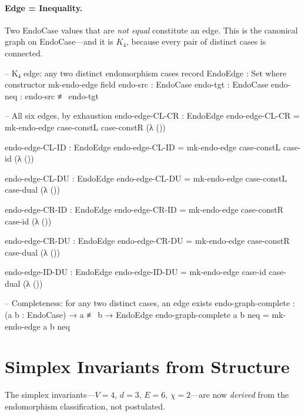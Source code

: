 \documentclass[11pt,a4paper]{book}
\begin{document}
\paragraph{Edge = Inequality.}
Two EndoCase values that are \emph{not equal} constitute an edge. This is the
canonical graph on EndoCase—and it is $K_4$, because every pair of distinct
cases is connected.

\begin{code}
-- K₄ edge: any two distinct endomorphism cases
record EndoEdge : Set where
  constructor mk-endo-edge
  field
    endo-src  : EndoCase
    endo-tgt  : EndoCase
    endo-neq  : endo-src ≢ endo-tgt

-- All six edges, by exhaustion
endo-edge-CL-CR : EndoEdge
endo-edge-CL-CR = mk-endo-edge case-constL case-constR (λ ())

endo-edge-CL-ID : EndoEdge
endo-edge-CL-ID = mk-endo-edge case-constL case-id (λ ())

endo-edge-CL-DU : EndoEdge
endo-edge-CL-DU = mk-endo-edge case-constL case-dual (λ ())

endo-edge-CR-ID : EndoEdge
endo-edge-CR-ID = mk-endo-edge case-constR case-id (λ ())

endo-edge-CR-DU : EndoEdge
endo-edge-CR-DU = mk-endo-edge case-constR case-dual (λ ())

endo-edge-ID-DU : EndoEdge
endo-edge-ID-DU = mk-endo-edge case-id case-dual (λ ())

-- Completeness: for any two distinct cases, an edge exists
endo-graph-complete : (a b : EndoCase) → a ≢ b → EndoEdge
endo-graph-complete a b neq = mk-endo-edge a b neq
\end{code}

\section{Simplex Invariants from Structure}
\label{sec:simplex-invariants-derived}

The simplex invariants—$V = 4$, $d = 3$, $E = 6$, $\chi = 2$—are now
\emph{derived} from the endomorphism classification, not postulated.
\end{document}
